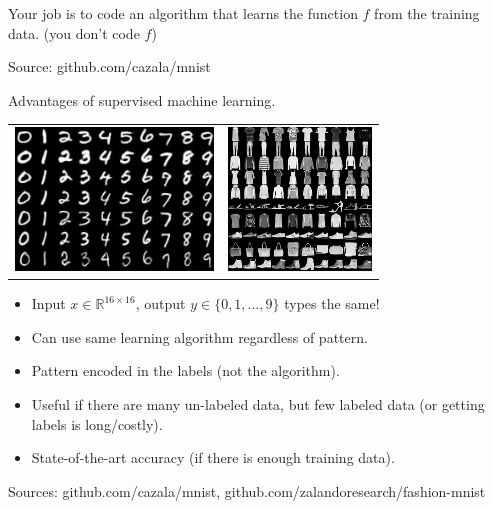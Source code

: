 \documentclass{article}
\newcommand{\RR}{\mathbb R}
\begin{document}
  Your job is to code an algorithm that learns the function $f$ from
  the training data. (you don't code $f$)
  
  Source: github.com/cazala/mnist

  Advantages of supervised machine learning.
  \begin{center}
      \begin{tabular}{cc}
        \includegraphics[height=1.5in]{mnist-digits} &
  \includegraphics[height=1.5in]{fashion-mnist-sprite-some}  
  \end{tabular}
  \end{center}
  \begin{itemize}
  \item Input $x\in\RR^{16\times 16}$, output $y\in\{0,1,\dots,9\}$ types the same!
  \item Can use same learning algorithm regardless of pattern.
  \item Pattern encoded in the labels (not the algorithm).
  \item Useful if there are many un-labeled data, but few labeled data
    (or getting labels is long/costly).
  \item State-of-the-art accuracy (if there is enough training data).
  \end{itemize}
  Sources: github.com/cazala/mnist, github.com/zalandoresearch/fashion-mnist
\end{document}
